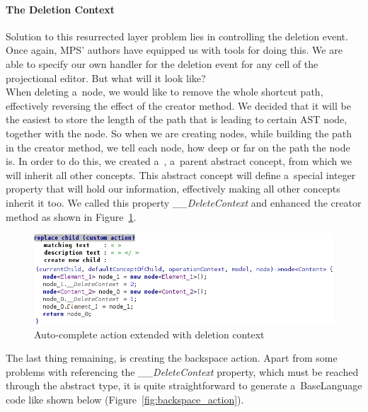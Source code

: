 \paragraph {The Deletion Context}

Solution to this resurrected layer problem lies in controlling the deletion event.
Once again, MPS' authors have equipped us with tools for doing this.
We are able to specify our own handler for the deletion event for any cell of the projectional editor.
But what will it look like?
\\

When deleting a~node, we would like to remove the whole shortcut path, effectively reversing the effect of the creator method.
We decided that it will be the easiest to store the length of the path that is leading to certain AST node, together with the node.
So when we are creating nodes, while building the path in the creator method, we tell each node, how deep or far on the path the node is.
In order to do this, we created a~, a~parent abstract concept, from which we will inherit all other concepts.
This abstract concept will define a~special integer property that will hold our information, effectively making all other concepts inherit it too.
We called this property \textit{{\_}{\_}DeleteContext} and enhanced the creator method as shown in Figure~\ref{fig:autocomplete_action_delete_context}.

\begin{figure}[h]
	\centering
	\includegraphics[width=\textwidth]{./img/autocomplete_action_delete_context.png}
	\caption{Auto-complete action extended with deletion context}
	\label{fig:autocomplete_action_delete_context}
\end{figure}

The last thing remaining, is creating the backspace action.
Apart from some problems with referencing the \textit{{\_}{\_}DeleteContext} property, which must be reached through the abstract  type, it is quite straightforward to generate a~BaseLanguage code like shown below (Figure~\ref{fig:backspace_action}).

